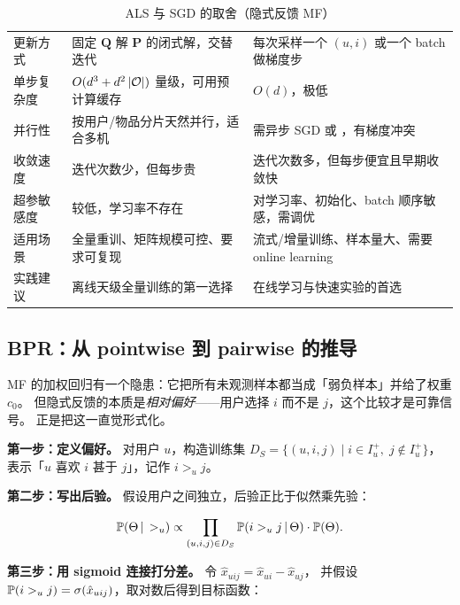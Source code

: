 \begin{table}[htbp]
\centering
\caption{ALS 与 SGD 的取舍（隐式反馈 MF）}
\label{tab:als-sgd}
\small
\begin{tabularx}{\textwidth}{L{2.1cm} L{3.9cm} Y}
\toprule
{} &  &  \\
\midrule
更新方式 & 固定 $\mathbf{Q}$ 解 $\mathbf{P}$ 的闭式解，交替迭代 & 每次采样一个 $(u,i)$ 或一个 batch 做梯度步 \\
单步复杂度 & $O(d^3 + d^2 \left\lvert \mathcal{O} \right\rvert)$ 量级，可用预计算缓存 & $O(d)$，极低 \\
并行性 & 按用户/物品分片天然并行，适合多机 & 需异步 SGD 或 ，有梯度冲突 \\
收敛速度 & 迭代次数少，但每步贵 & 迭代次数多，但每步便宜且早期收敛快 \\
超参敏感度 & 较低，学习率不存在 & 对学习率、初始化、batch 顺序敏感，需调优 \\
适用场景 & 全量重训、矩阵规模可控、要求可复现 & 流式/增量训练、样本量大、需要 online learning \\
实践建议 & 离线天级全量训练的第一选择 & 在线学习与快速实验的首选 \\
\bottomrule
\end{tabularx}
\end{table}

\subsection{BPR：从 pointwise 到 pairwise 的推导}

MF 的加权回归有一个隐患：它把所有未观测样本都当成「弱负样本」并给了权重 $c_0$。
但隐式反馈的本质是\emph{相对偏好}——用户选择 $i$ 而不是 $j$，这个比较才是可靠信号。
\cite{rendle2009bpr} 正是把这一直觉形式化。

\textbf{第一步：定义偏好。} 对用户 $u$，构造训练集
$D_S = \{(u, i, j) \mid i \in I_u^{+}, \; j \notin I_u^{+}\}$，
表示「$u$ 喜欢 $i$ 甚于 $j$」，记作 $i >_u j$。

\textbf{第二步：写出后验。} 假设用户之间独立，后验正比于似然乘先验：

\begin{equation}
\operatorname{\mathbb{P}}(\Theta \,\vert\, >_u) \propto \prod_{(u,i,j) \in D_S} \operatorname{\mathbb{P}}(i >_u j \,\vert\, \Theta) \cdot \operatorname{\mathbb{P}}(\Theta) .
\label{eq:bpr-posterior}
\end{equation}

\textbf{第三步：用 sigmoid 连接打分差。} 令 $\hat x_{uij} = \hat x_{ui} - \hat x_{uj}$，
并假设 $\operatorname{\mathbb{P}}(i >_u j) = \operatorname{\sigma}(\hat x_{uij})$，取对数后得到目标函数：

